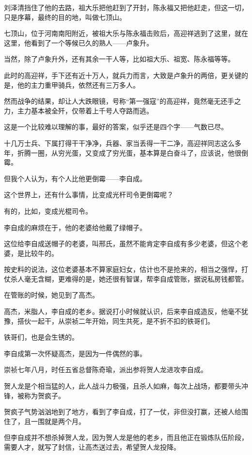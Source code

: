\begin{multicols}{\theparacolNo}
		刘泽清挡住了他的去路，祖大乐把他赶到了开封，陈永福又把他赶走，但这一切，只是序幕，最终的目的地，叫做七顶山。

		七顶山，位于河南南阳附近，被祖大乐与陈永福击败后，高迎祥逃到了这里，就在这里，他看到了一个等候已久的熟人——卢象升。

		当然，除了卢象升外，还有其余一干人等，比如祖大乐、祖宽、陈永福等等。

		此时的高迎祥，手下还有近十万人，就兵力而言，大致是卢象升的两倍，更关键的是，他的主力重甲骑兵，依然还有三万多人。

		然而战争的结果，却让人大跌眼镜，号称“第一强寇”的高迎祥，竟然毫无还手之力，主力基本被全歼，仅带着上千号人夺路而逃。

		这是一个比较难以理解的事，最好的答案，似乎还是四个字——气数已尽。

		十几万士兵、下属打得干干净净，兵器、家当丢得一干二净，高迎祥同志这么多年，折腾一圈，从穷光蛋，又变成了穷光蛋，基本算是白奋斗了，应该说，他很倒霉。

		但我个人认为，有个人比他更倒霉——李自成。

		这个世界上，还有什么事情，比变成光杆司令更倒霉呢？

		有的，比如，变成光棍司令。

		李自成的麻烦在于，他的老婆给他戴了绿帽子。

		这位给李自成送帽子的老婆，叫邢氏，虽然不能肯定李自成有多少老婆，但这个老婆，是比较牛的。

		按史料的说法，这位老婆基本不算家庭妇女，估计也不是抢来的，相当之强悍，打仗杀人毫无含糊，更难得的是，她还很有智谋，帮李自成管账，据说私房钱都管。

		在管账的时候，她见到了高杰。

		高杰，米脂人，李自成的老乡。据说打小时候就认识，后来李自成造反，他毫不犹豫，搭伙一起干，从崇祯二年开始，同生共死，是不折不扣的铁哥们。

		铁哥们，也是会生锈的。

		李自成第一次怀疑高杰，是因为一件偶然的事。

		崇祯七年八月，时任五省总督陈奇瑜，派出参将贺人龙进攻李自成。

		贺人龙是个相当猛的人，此人战斗力极强，且杀人如麻，每次上战场，都要带头冲锋，被称为贺疯子。

		贺疯子气势汹汹地到了地方，看到了李自成，打了一仗，非但没打赢，还被人给围住了，且一围就是两个月。

		但李自成并不想杀掉贺人龙，因为贺人龙是他的老乡，而且他正在锻炼队伍阶段，需要人才，就写了封信，让高杰送过去，希望贺人龙投降。


\end{multicols}
